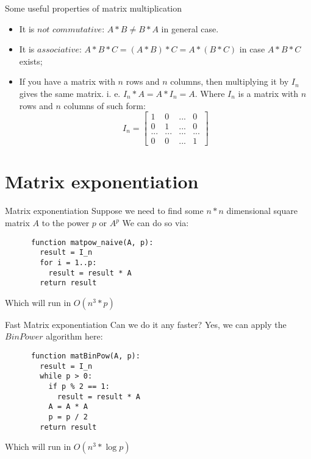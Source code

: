 \documentclass{beamer}
\begin{document}
\begin{frame}{Some useful properties of matrix multiplication}
	\begin{itemize}
	    \item 
    	    It is $not$ $commutative$: $A * B \neq B * A$ in general case.
	    \item
	        It is $associative$: \newline $A * B * C = (A * B) * C = A * (B * C)$ in case $A * B * C$ exists;
            \item
	        If you have a matrix with $n$ rows and $n$ columns,
	        \newline then multiplying it by $I_n$ gives the same matrix. 
	        \newline i. e. $I_n * A = A * I_n = A$.
	        \newline Where $I_n$ is a matrix with $n$ rows and $n$ columns of such form:
	        \[
	          I_n = 
        	  \left[ {\begin{array}{cccc}
                    1 & 0 & ... & 0 \\
                    0 & 1 & ... & 0 \\
                    ...   &   ...   & ... &   ...   \\
                    0 & 0 & ... & 1
                    \end{array} } 
                  \right]
                \]
	\end{itemize}
\end{frame}

\section{Matrix exponentiation}

\begin{frame}[fragile]{Matrix exponentiation}
    Suppose we need to find some $n*n$ dimensional square matrix $A$ to the power $p$ or $A^p$
    \newline We can do so via:
      \begin{lstlisting}
      function matpow_naive(A, p):
        result = I_n
        for i = 1..p:
          result = result * A
        return result
      \end{lstlisting}
    Which will run in $O(n^3 * p)$
\end{frame}

\begin{frame}[fragile]{Fast Matrix exponentiation}
    Can we do it any faster?
    \newline Yes, we can apply the $BinPower$ algorithm here:
      \begin{lstlisting}
      function matBinPow(A, p):
        result = I_n
        while p > 0:
          if p % 2 == 1:
            result = result * A
          A = A * A
          p = p / 2
        return result
      \end{lstlisting}
    Which will run in $O(n^3 * \log{p})$
\end{frame}
\end{document}
